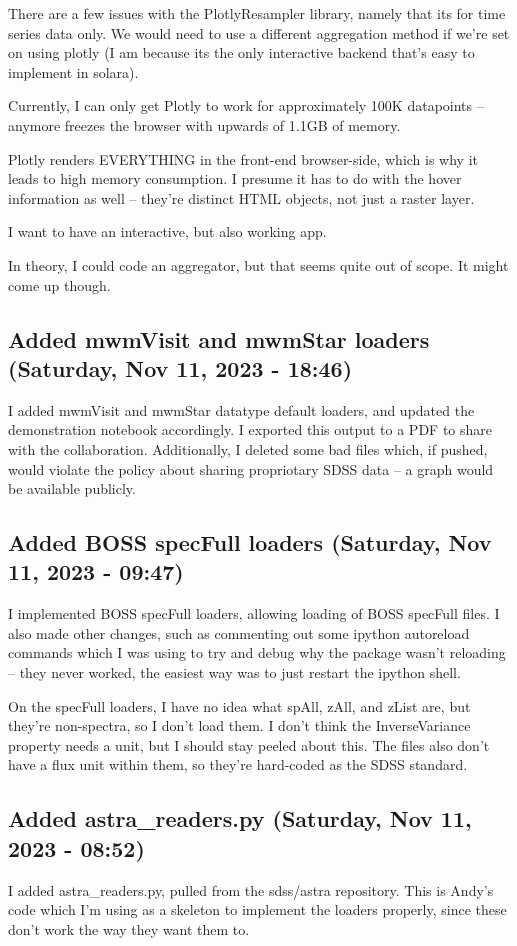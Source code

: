 \documentclass[a4paper]{article}
\begin{document}
There are a few issues with the PlotlyResampler library, namely that its for time series data only. We would need to use a different aggregation method if we're set on using plotly (I am because its the only interactive backend that's easy to implement in solara).

Currently, I can only get Plotly to work for approximately 100K datapoints -- anymore freezes the browser with upwards of 1.1GB of memory.

Plotly renders EVERYTHING in the front-end browser-side, which is why it leads to high memory consumption. I presume it has to do with the hover information as well -- they're distinct HTML objects, not just a raster layer.

I want to have an interactive, but also working app.

In theory, I could code an aggregator, but that seems quite out of scope. It might come up though.

\subsection*{Added mwmVisit and mwmStar loaders (Saturday, Nov 11, 2023 - 18:46)}
I added mwmVisit and mwmStar datatype default loaders, and updated the demonstration notebook accordingly. I exported this output to a PDF to share with the collaboration. Additionally, I deleted some bad files which, if pushed, would violate the policy about sharing propriotary SDSS data -- a graph would be available publicly.

\subsection*{Added BOSS specFull loaders (Saturday, Nov 11, 2023 - 09:47)}
I implemented BOSS specFull loaders, allowing loading of BOSS specFull files. I also made other changes, such as commenting out some ipython autoreload commands which I was using to try and debug why the package wasn't reloading -- they never worked, the easiest way was to just restart the ipython shell.

On the specFull loaders, I have no idea what spAll, zAll, and zList are, but they're non-spectra, so I don't load them. I don't think the InverseVariance property needs a unit, but I should stay peeled about this. The files also don't have a flux unit within them, so they're hard-coded as the SDSS standard.

\subsection*{Added astra\_readers.py (Saturday, Nov 11, 2023 - 08:52)}
I added astra\_readers.py, pulled from the sdss/astra repository. This is Andy's code which I'm using as a skeleton to implement the loaders properly, since these don't work the way they want them to.
\end{document}
